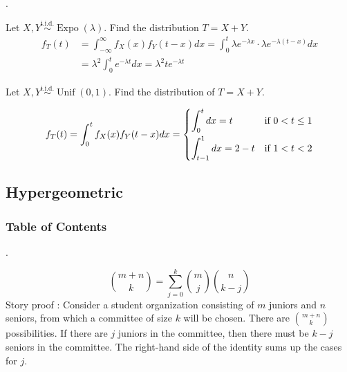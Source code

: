 \documentclass[8pt]{beamer}
\newcommand{\Unif}[2]{\operatorname{Unif}\!\left(#1, #2\right)}
\newcommand{\Expo}[1]{\operatorname{Expo}\!\left(#1\right)}
\begin{document}
\begin{frame}{.}
    \begin{example}
        Let $X,Y \overset{\text{i.i.d.}}{\sim} \Expo{\lambda}$. Find the distribution $T=X+Y$.
        \[
            \begin{aligned}
                f_T(t) &= \int_{-\infty}^\infty f_X(x) f_Y(t-x) dx = \int_{0}^t \lambda e^{-\lambda x} \cdot \lambda e^{-\lambda (t-x)} dx \\
                &= \lambda^2 \int_{0}^t e^{-\lambda t} dx = \lambda^2 t e^{-\lambda t}
            \end{aligned}
        \]
    \end{example}


    \begin{example}
        Let $X,Y \overset{\text{i.i.d.}}{\sim} \Unif{0}{1}$. Find the distribution of $T = X+Y$.

        \[
            f_T(t) = \int_{0}^t f_X(x) f_Y(t-x) dx =
            \begin{dcases}
                \int_{0}^t dx = t & \text{if } 0<t \leq 1 \\
                \int_{t-1}^1 dx = 2 - t & \text{if } 1<t<2 \\
            \end{dcases}
        \]
    \end{example}
\end{frame}

\subsection{Hypergeometric}

\begingroup
    \begin{frame}
        \frametitle{Table of Contents}
        \tableofcontents[currentsubsection]
    \end{frame}
\endgroup

\begin{frame}{.}
    \begin{example}
        \[
            \binom{m+n}{k} = \sum_{j=0}^k \binom{m}{j} \binom{n}{k-j}
        \]
        Story proof : Consider a student organization consisting of $m$ juniors and $n$ seniors,  from which a committee of size $k$ will be chosen. 
        There are $\binom{m+n}{k}$ possibilities.
        If there are $j$ juniors in the committee, then there must be $ k-j$ seniors in the committee. 
        The right-hand side of the identity sums up the cases for $j$.
    \end{example}


\end{frame}
\end{document}
